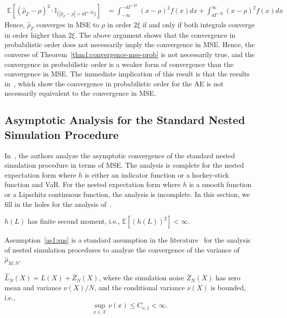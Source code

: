 \begin{align*}
    \mathbb{E} \left[ \left(\hat{\rho}_{\Gamma} - \rho\right)^2 \cdot \mathbb{I}_{\{|\hat{\rho}_{\Gamma} - \rho| > d\Gamma^{-2\xi}\}} \right] 
    & = \int_{-\infty}^{-d\Gamma^{-2k}} (x - \rho)^2 f(x) dx + \int_{d\Gamma^{-2\xi}}^{\infty} (x - \rho)^2 f(x) dx 
\end{align*}
Hence, $\hat{\rho}_{\Gamma}$ converges in MSE to $\rho$ in order $2\xi$ if and only if both integrals converge in order higher than $2\xi$. 
The above argument shows that the convergence in probabilistic order does not necessarily imply the convergence in MSE.
Hence, the converse of Theorem~\ref{thm1:convergence-mse-prob} is not necessarily true, and the convergence in probabilistic order is a weaker form of convergence than the convergence in MSE.
The immediate implication of this result is that the results in~\cite{wang2022smooth}, which show the convergence in probabilistic order for the AE is not necessarily equivalent to the convergence in MSE.

\subsection{Asymptotic Analysis for the Standard Nested Simulation Procedure} \label{sec1:sns}
In~\cite{gordy2010nested}, the authors analyze the asymptotic convergence of the standard nested simulation procedure in terms of MSE. 
The analysis is complete for the nested expectation form where $h$ is either an indicator function or a hockey-stick function and VaR. 
For the nested expectation form where $h$ is a smooth function or a Lipschitz continuous function, the analysis is incomplete.
In this section, we fill in the holes for the analysis of~\cite{gordy2010nested}.

\begin{assumption} \label{as1:sns}
    $h(L)$ has finite second moment, i.e., $\mathbb{E} \left[ \left( h(L) \right)^2 \right] < \infty$.
\end{assumption}

Assumption~\ref{as1:sns} is a standard assumption in the literature~\citep{hong2017kernel} for the analysis of nested simulation procedures to analyze the convergence of the variance of $\hat{\rho}_{M, N}$.

\begin{assumption} \label{as1:sns-noise}
    $\hat{L}_N(X) = L(X) + \bar{Z}_N(X)$, where the simulation noise $\bar{Z}_N(X)$ has zero mean and variance $\nu(X) / N$, and the conditional variance $\nu(X)$ is bounded, i.e., 
    $$
        \sup_{x \in \mathcal{X}} \nu(x) \leq C_{\nu, 1} < \infty.
    $$
\end{assumption}

